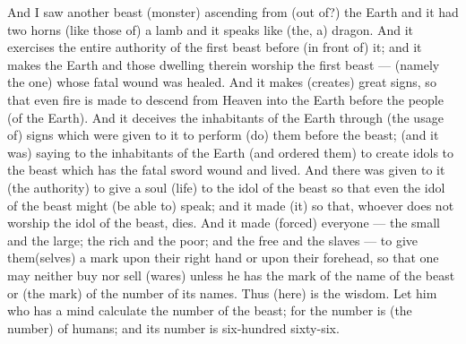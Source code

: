 \begin{pages}
\begin{Leftside}
		\pend
		\pstart
		And I saw another beast (monster) ascending from (out of?) the Earth and it had two horns (like those of) a lamb and it speaks like (the, a) dragon. And it exercises the entire authority of the first beast before (in front of) it; and it makes the Earth and those dwelling therein worship the first beast — (namely the one) whose fatal wound was healed. And it makes (creates) great signs, so that even fire is made to descend from Heaven into the Earth before the people (of the Earth). 
		\pend
		\pstart	
		And it deceives the inhabitants of the Earth through (the usage of) signs which were given to it to perform (do) them before the beast; (and it was) saying to the inhabitants of the Earth (and ordered them) to create idols to the beast which has the fatal sword wound and lived. And there was given to it (the authority) to give a soul (life) to the idol of the beast so that even the idol of the beast might (be able to) speak; and it made (it) so that, whoever does not worship the idol of the beast, dies. 
		\pend
		\pstart
		And it made (forced) everyone — the small and the large; the rich and the poor; and the free and the slaves — to give them(selves) a mark upon their right hand or upon their forehead, so that one may neither buy nor sell (wares) unless he has the mark of the name of the beast or (the mark) of the number of its names. Thus (here) is the wisdom. Let him who has a mind calculate the number of the beast; for the number is (the number) of humans; and its number is six-hundred sixty-six. 
		\pend
        \endnumbering
    \end{Leftside}

\end{pages} 
\Pages

